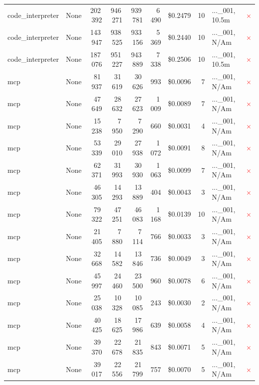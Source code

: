 \documentclass[a4paper,11pt]{article}
\begin{document}
\begin{table}[H]
{\begin{tabular}{l r r r r r r r l c}
code\_interpreter & None & 202\,392 & 946\,271 & 939\,781 & 6\,490 & \$0.2479 & 10 & ...\_001, 10.5m & \textcolor{red}{\(\times\)} \\
code\_interpreter & None & 143\,947 & 938\,525 & 933\,156 & 5\,369 & \$0.2440 & 10 & ...\_001, N/Am & \textcolor{red}{\(\times\)} \\
code\_interpreter & None & 187\,076 & 951\,227 & 943\,889 & 7\,338 & \$0.2506 & 10 & ...\_001, 10.5m & \textcolor{red}{\(\times\)} \\
\midrule
mcp & None & 81\,937 & 31\,619 & 30\,626 & 993 & \$0.0096 & 7 & ...\_001, N/Am & \textcolor{red}{\(\times\)} \\
mcp & None & 47\,649 & 28\,632 & 27\,623 & 1\,009 & \$0.0089 & 7 & ...\_001, N/Am & \textcolor{red}{\(\times\)} \\
mcp & None & 15\,238 & 7\,950 & 7\,290 & 660 & \$0.0031 & 4 & ...\_001, N/Am & \textcolor{red}{\(\times\)} \\
mcp & None & 53\,339 & 29\,010 & 27\,938 & 1\,072 & \$0.0091 & 8 & ...\_001, N/Am & \textcolor{red}{\(\times\)} \\
mcp & None & 62\,371 & 31\,993 & 30\,930 & 1\,063 & \$0.0099 & 7 & ...\_001, N/Am & \textcolor{red}{\(\times\)} \\
mcp & None & 46\,305 & 14\,293 & 13\,889 & 404 & \$0.0043 & 3 & ...\_001, N/Am & \textcolor{red}{\(\times\)} \\
mcp & None & 79\,322 & 47\,251 & 46\,083 & 1\,168 & \$0.0139 & 10 & ...\_001, N/Am & \textcolor{red}{\(\times\)} \\
mcp & None & 21\,405 & 7\,880 & 7\,114 & 766 & \$0.0033 & 3 & ...\_001, N/Am & \textcolor{red}{\(\times\)} \\
mcp & None & 32\,668 & 14\,582 & 13\,846 & 736 & \$0.0049 & 3 & ...\_001, N/Am & \textcolor{red}{\(\times\)} \\
mcp & None & 45\,997 & 24\,460 & 23\,500 & 960 & \$0.0078 & 6 & ...\_001, N/Am & \textcolor{red}{\(\times\)} \\
mcp & None & 25\,038 & 10\,328 & 10\,085 & 243 & \$0.0030 & 2 & ...\_001, N/Am & \textcolor{red}{\(\times\)} \\
mcp & None & 40\,425 & 18\,625 & 17\,986 & 639 & \$0.0058 & 4 & ...\_001, N/Am & \textcolor{red}{\(\times\)} \\
mcp & None & 39\,370 & 22\,678 & 21\,835 & 843 & \$0.0071 & 5 & ...\_001, N/Am & \textcolor{red}{\(\times\)} \\
mcp & None & 39\,017 & 22\,556 & 21\,799 & 757 & \$0.0070 & 5 & ...\_001, N/Am & \textcolor{red}{\(\times\)} \\

\end{tabular}}
\end{table}
\end{document}
